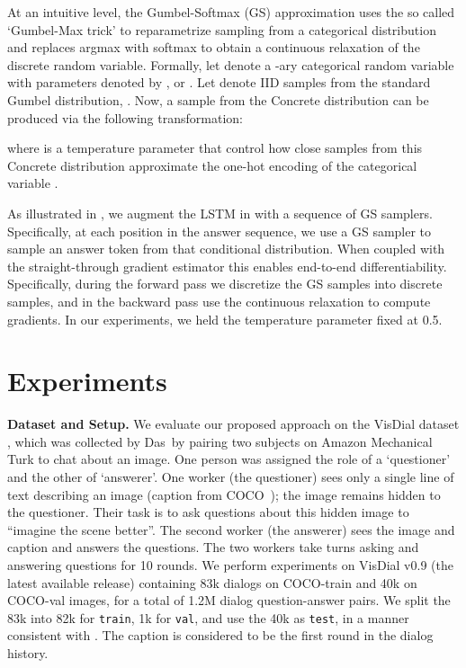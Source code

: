 \documentclass{article}
\newcommand{\vd}{VisDial\xspace}
\newcommand{\train}{\texttt{train}\xspace}
\newcommand{\val}{\texttt{val}\xspace}
\newcommand{\test}{\texttt{test}\xspace}
\begin{document}
At an intuitive level, the Gumbel-Softmax (GS) approximation uses the so called `Gumbel-Max trick' to reparametrize sampling 
from a categorical distribution and replaces argmax with softmax to obtain a continuous relaxation of the discrete random 
variable. Formally, let  denote a -ary categorical random variable with parameters denoted by 
, or . Let  denote  IID samples from the standard Gumbel distribution, 
. Now, a sample from the Concrete distribution can be produced via the following transformation: 

where  is a temperature parameter that control how close samples  from this Concrete distribution approximate the 
one-hot encoding of the categorical variable . 

As illustrated in , we augment the LSTM in  with a sequence of GS samplers. 
Specifically, at each position in the answer sequence, we use a GS sampler to sample an answer token from that conditional 
distribution. 
When coupled with the straight-through gradient estimator 
\cite{BengioLC13, jang2016categorical} this enables end-to-end differentiability. 
Specifically, 
during the forward pass we discretize the GS samples into discrete samples, 
and in the backward pass use the continuous relaxation to compute gradients.  In our experiments, we held the temperature parameter fixed at 0.5. 
\section{Experiments}
\label{sec:exp}
\vspace{-1mm}


\textbf{Dataset and Setup.}
We evaluate our proposed approach on the \vd dataset \cite{visdial}, 
which was collected by Das~\etal by pairing two subjects on Amazon Mechanical Turk to chat about an image. 
One person was assigned the role of a `questioner' and the other of `answerer'.
One worker (the questioner) sees only a single line of text describing an image (caption from COCO~\cite{lin2014microsoft}); 
the image remains hidden to the questioner. 
Their task is to ask questions about this hidden image to ``imagine the scene better''. 
The second worker (the answerer) sees the image and caption and answers the questions. 
The two workers take turns asking and answering questions for 10 rounds. 
We perform experiments on \vd v0.9 (the latest available release) containing 83k dialogs on COCO-train and 
40k on COCO-val images, for a total of 1.2M dialog question-answer pairs.  
We split the 83k into 82k for \train, 1k for \val, and use the 40k as \test, in a manner consistent with \cite{visdial}. 
The caption is considered to be the first round in the dialog history. 
 
\end{document}
